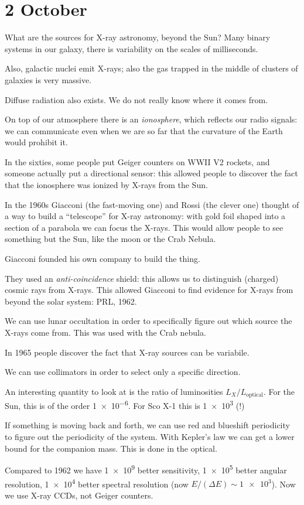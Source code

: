 \documentclass[main.tex]{subfiles}
\begin{document}
\section*{2 October}

What are the sources for X-ray astronomy, beyond the Sun? Many binary systems in our galaxy, there is variability on the scales of milliseconds.

Also, galactic nuclei emit X-rays; also the gas trapped in the middle of clusters of galaxies is very massive.

Diffuse radiation also exists. We do not really know where it comes from.

On top of our atmosphere there is an \emph{ionosphere}, which reflects our radio signals: we can communicate even when we are so far that the curvature of the Earth would prohibit it.

In the sixties, some people put Geiger counters on WWII V2 rockets, and someone actually put a directional sensor: this allowed people to discover the fact that the ionosphere was ionized by X-rays from the Sun.

In the 1960s Giacconi (the fast-moving one) and Rossi (the clever one) thought of a way to build a ``telescope'' for X-ray astronomy: with gold foil shaped into a section of a parabola we can focus the X-rays.
This would allow people to see something but the Sun, like the moon or the Crab Nebula.

Giacconi founded his own company to build the thing.

They used an \emph{anti-coincidence} shield: this allows us to distinguish (charged) cosmic rays from X-rays.
This allowed Giacconi to find evidence for X-rays from beyond the solar system: PRL, 1962.

We can use lunar occultation in order to specifically figure out which source the X-rays come from. This was used with the Crab nebula.

In 1965 people discover the fact that X-ray sources can  be variabile.

We can use collimators in order to select only a specific direction.

An interesting quantity to look at is the ratio of luminosities \(L_X / L_{\text{optical}}\). For the Sun, this is of the order \num{1e-6}. For Sco X-1 this is \num{1e3} (!)

If something is moving back and forth, we can use red and blueshift periodicity to figure out the periodicity of the system.
With Kepler's law we can get a lower bound for the companion mass.
This is done in the optical.

Compared to 1962 we have \num{1e9} better sensitivity, \num{1e5} better angular resolution, \num{1e4} better spectral resolution (now \(E / (\Delta E ) \sim \num{1e3} \)). Now we use X-ray CCDs, not Geiger counters.
\end{document}
